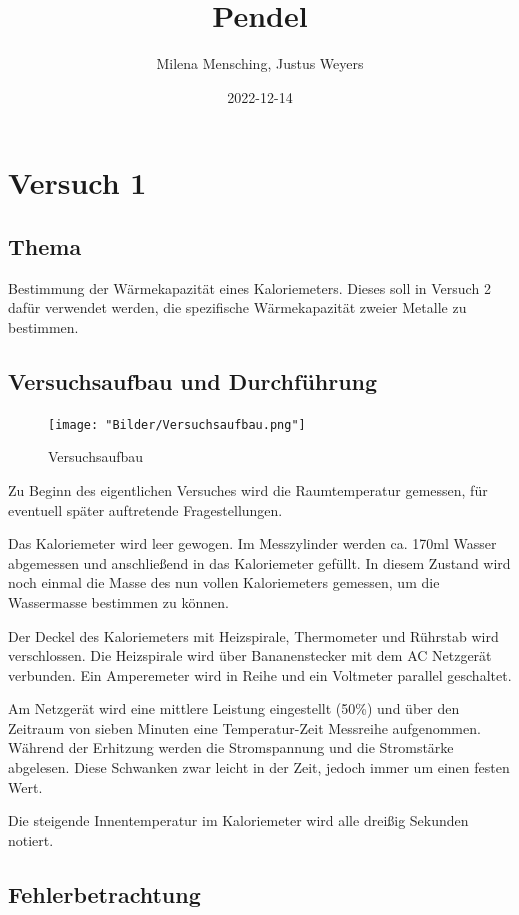 \documentclass[class=article, crop=false]{standalone}
\title{Pendel}
\author{Milena Mensching, Justus Weyers}
\date{2022-12-14}
\begin{document}
\hypertarget{versuch-1}{%
\section{Versuch 1}\label{versuch-1}}

\hypertarget{thema}{%
\subsection{Thema}\label{thema}}

Bestimmung der Wärmekapazität eines Kaloriemeters. Dieses soll in
Versuch 2 dafür verwendet werden, die spezifische Wärmekapazität zweier
Metalle zu bestimmen.

\hypertarget{versuchsaufbau-und-durchfuxfchrung}{%
\subsection{Versuchsaufbau und
Durchführung}\label{versuchsaufbau-und-durchfuxfchrung}}

\begin{figure}
\centering
\texttt{[image: "Bilder/Versuchsaufbau.png"]}
\caption{Versuchsaufbau}
\end{figure}

Zu Beginn des eigentlichen Versuches wird die Raumtemperatur gemessen,
für eventuell später auftretende Fragestellungen.

Das Kaloriemeter wird leer gewogen. Im Messzylinder werden ca. 170ml
Wasser abgemessen und anschließend in das Kaloriemeter gefüllt. In
diesem Zustand wird noch einmal die Masse des nun vollen Kaloriemeters
gemessen, um die Wassermasse bestimmen zu können.

Der Deckel des Kaloriemeters mit Heizspirale, Thermometer und Rührstab
wird verschlossen. Die Heizspirale wird über Bananenstecker mit dem AC
Netzgerät verbunden. Ein Amperemeter wird in Reihe und ein Voltmeter
parallel geschaltet.

Am Netzgerät wird eine mittlere Leistung eingestellt (50\%) und über den
Zeitraum von sieben Minuten eine Temperatur-Zeit Messreihe aufgenommen.
Während der Erhitzung werden die Stromspannung und die Stromstärke
abgelesen. Diese Schwanken zwar leicht in der Zeit, jedoch immer um
einen festen Wert.

Die steigende Innentemperatur im Kaloriemeter wird alle dreißig Sekunden
notiert.

\hypertarget{fehlerbetrachtung}{%
\subsection{Fehlerbetrachtung}\label{fehlerbetrachtung}}
\end{document}
